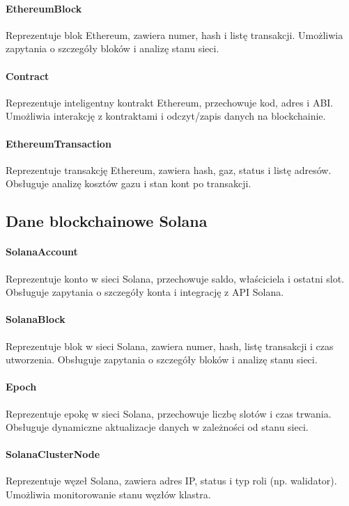 \paragraph{EthereumBlock} Reprezentuje blok Ethereum, zawiera numer, hash i listę transakcji. Umożliwia zapytania o szczegóły bloków i analizę stanu sieci.

\paragraph{Contract} Reprezentuje inteligentny kontrakt Ethereum, przechowuje kod, adres i ABI. Umożliwia interakcję z kontraktami i odczyt/zapis danych na blockchainie.

\paragraph{EthereumTransaction} Reprezentuje transakcję Ethereum, zawiera hash, gaz, status i listę adresów. Obsługuje analizę kosztów gazu i stan kont po transakcji.

\subsection{Dane blockchainowe Solana}

\paragraph{SolanaAccount} Reprezentuje konto w sieci Solana, przechowuje saldo, właściciela i ostatni slot. Obsługuje zapytania o szczegóły konta i integrację z API Solana.

\paragraph{SolanaBlock} Reprezentuje blok w sieci Solana, zawiera numer, hash, listę transakcji i czas utworzenia. Obsługuje zapytania o szczegóły bloków i analizę stanu sieci.

\paragraph{Epoch} Reprezentuje epokę w sieci Solana, przechowuje liczbę slotów i czas trwania. Obsługuje dynamiczne aktualizacje danych w zależności od stanu sieci.

\paragraph{SolanaClusterNode} Reprezentuje węzeł Solana, zawiera adres IP, status i typ roli (np. walidator). Umożliwia monitorowanie stanu węzłów klastra.

